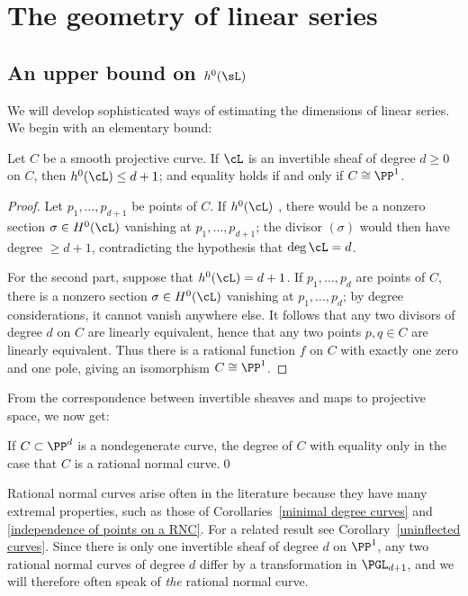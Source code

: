 \section{The geometry of linear series}

\subsection*{An upper bound on $h^0(\sL)$}

We will develop sophisticated ways of estimating the dimensions of linear series. We begin with an elementary bound:

\begin{theorem}\label{characterization of P1}
Let $C$ be a smooth projective curve. If $\cL$ is an invertible sheaf of degree $d\geq 0$ on $C$, then $h^0(\cL)\leq d+1$; and
equality holds if and only if $C \cong \PP^1$.
\end{theorem}

\begin{proof}
Let $p_1,\dots,p_{d+1}$ be 
points of $C$. If $h^0(\cL)$
,
there would be a nonzero section
$\sigma \in H^0(\cL)$ vanishing at $p_1,\dots,p_{d+1}$; the divisor
$(\sigma)$ would then have degree $\geq d+1$, contradicting the
hypothesis that $\deg \cL = d$.

For the second part, suppose that $h^0(\cL) = d+1$. If
$p_1,\dots,p_{d}$ are points of $C$, there is a nonzero section
$\sigma \in H^0(\cL)$ vanishing at $p_1,\dots,p_{d}$; by degree
considerations, it cannot vanish anywhere else. It follows that any
two divisors of degree $d$ on $C$ are linearly equivalent, hence that
any two points $p,q \in C$ are linearly equivalent. Thus there is a
rational function $f$ on $C$ with exactly one zero and one pole,
giving an isomorphism $C \cong \PP^1$. 
 \end{proof}

From the correspondence between invertible sheaves and maps to projective space, we now get:
\begin{corollary}\label{minimal degree curves}
If $C\subset \PP^d$ is a  nondegenerate curve, 
the degree of $C$ 
with equality only in the case
that $C$ is a rational normal curve.\qed
\end{corollary}

Rational normal curves arise often in the literature because they have many extremal properties, such as those of Corollaries~\ref{minimal degree curves} and \ref{independence of points on a RNC}. For a related result see Corollary~\ref{uninflected curves}. Since there is only
one invertible sheaf of degree $d$ on $\PP^1$,
any two rational normal curves of degree $d$ differ by a transformation in $\PGL_{d+1}$,
and we will therefore often speak of \emph{the} 
rational normal curve.
%

